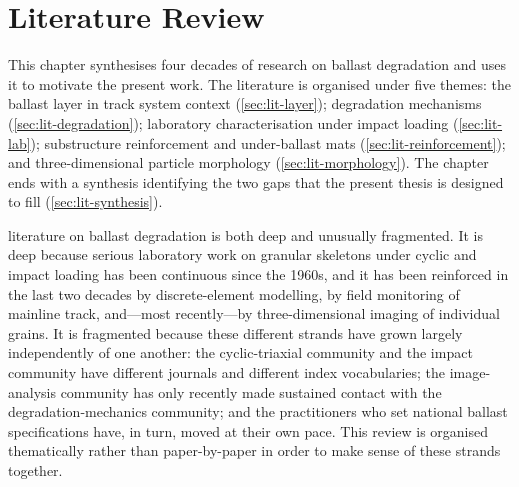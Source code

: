 \chapter{Literature Review}
\label{chap:literature}


\begin{chapterpreview}
This chapter synthesises four decades of research on ballast
degradation and uses it to motivate the present work. The literature
is organised under five themes: the ballast layer in track system context
(\cref{sec:lit-layer}); degradation mechanisms
(\cref{sec:lit-degradation}); laboratory characterisation under impact
loading (\cref{sec:lit-lab}); substructure reinforcement and
under-ballast mats (\cref{sec:lit-reinforcement}); and three-dimensional
particle morphology (\cref{sec:lit-morphology}). The chapter ends with
a synthesis identifying the two gaps that the present thesis is
designed to fill (\cref{sec:lit-synthesis}).
\end{chapterpreview}

 literature on ballast degradation is both deep and unusually fragmented.
It is deep because serious laboratory work on granular skeletons under
cyclic and impact loading has been continuous since the 1960s, and it has
been reinforced in the last two decades by discrete-element modelling, by
field monitoring of mainline track, and---most recently---by
three-dimensional imaging of individual grains. It is fragmented because
these different strands have grown largely independently of one another:
the cyclic-triaxial community and the impact community have different
journals and different index vocabularies; the image-analysis community has
only recently made sustained contact with the degradation-mechanics
community; and the practitioners who set national ballast specifications
have, in turn, moved at their own pace. This review is organised
thematically rather than paper-by-paper in order to make sense of these
strands together.

